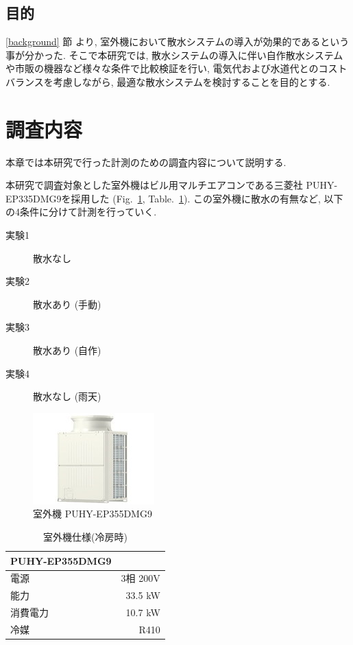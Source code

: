 \documentclass[a4j,fleqn,dvipdfmx,uplatex]{jsarticle}
\newcommand{\figref}[1]{Fig.\ \ref{#1}}
\newcommand{\tableref}[1]{Table.\ \ref{#1}}
\newcommand{\subsecref}[1]{\ref{#1}\hspace{0.2zw} 節}
\begin{document}
\subsection{目的}\label{purpose}
\subsecref{background} より, 室外機において散水システムの導入が効果的であるという事が分かった. 
そこで本研究では, 散水システムの導入に伴い自作散水システムや市販の機器など様々な条件で比較検証を行い, 
電気代および水道代とのコストバランスを考慮しながら, 最適な散水システムを検討することを目的とする. 

\section{調査内容}\label{sec2}
本章では本研究で行った計測のための調査内容について説明する. 

本研究で調査対象とした室外機はビル用マルチエアコンである三菱社 
PUHY-EP335DMG9を採用した (\figref{fig:condensing_unit}, \tableref{table:hard}). 
この室外機に散水の有無など, 以下の4条件に分けて計測を行っていく.  

\begin{description}
  \item[  実験1 ] 散水なし
  \item[  実験2 ] 散水あり (手動)
  \item[  実験3 ] 散水あり (自作)
  \item[  実験4 ] 散水なし (雨天)
\end{description}

\begin{figure}[htb]
  \centering
  \includegraphics[width=0.7\linewidth]{img/PUHY-EP335DMG9.jpg}
  \caption{室外機 PUHY-EP355DMG9}
  \label{fig:condensing_unit}
\end{figure}

\begin{table}[htb]
  \caption{室外機仕様(冷房時)}
  \label{table:hard}
  \centering
  \begin{tabular}{lr}
    PUHY-EP355DMG9 & \\
    \hline \hline
    電源 & 3相 200V \\
    能力 & 33.5 kW \\
    消費電力 & 10.7 kW \\
    冷媒 & R410 \\
    \hline
  \end{tabular}
\end{table}
\end{document}
